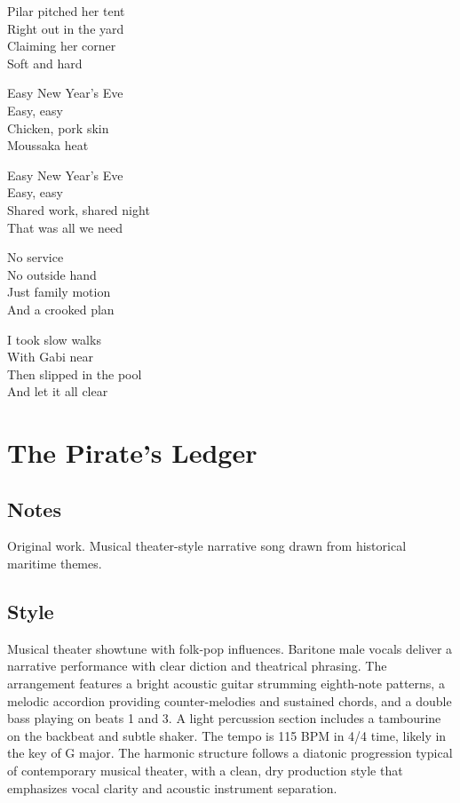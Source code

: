 \begin{lyrics}
Pilar pitched her tent\\
Right out in the yard\\
Claiming her corner\\
Soft and hard

Easy New Year's Eve\\
Easy, easy\\
Chicken, pork skin\\
Moussaka heat

Easy New Year's Eve\\
Easy, easy\\
Shared work, shared night\\
That was all we need

No service\\
No outside hand\\
Just family motion\\
And a crooked plan

I took slow walks\\
With Gabi near\\
Then slipped in the pool\\
And let it all clear
\end{lyrics}

\section{The Pirate's Ledger}

\subsection{Notes}
Original work.
Musical theater-style narrative song drawn from historical maritime themes.

\subsection{Style}
Musical theater showtune with folk-pop influences. Baritone male vocals deliver a narrative performance with clear diction and theatrical phrasing. The arrangement features a bright acoustic guitar strumming eighth-note patterns, a melodic accordion providing counter-melodies and sustained chords, and a double bass playing on beats 1 and 3. A light percussion section includes a tambourine on the backbeat and subtle shaker. The tempo is 115 BPM in 4/4 time, likely in the key of G major. The harmonic structure follows a diatonic progression typical of contemporary musical theater, with a clean, dry production style that emphasizes vocal clarity and acoustic instrument separation.

